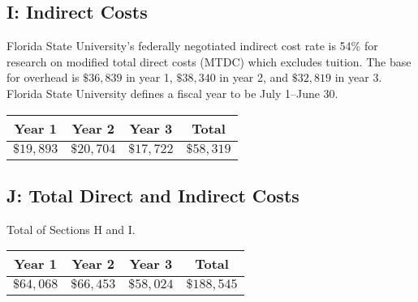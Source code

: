 \documentclass[11pt]{article}
\begin{document}
\subsection*{I: Indirect Costs}
Florida State University's federally negotiated indirect cost rate is
54\% for research on modified total direct costs (MTDC) which excludes
tuition. The base for overhead is $\$36,839$ in year 1, $\$38,340$ in
year 2, and $\$32,819$ in year 3. Florida State University defines a
fiscal year to be July 1--June 30.
\begin{center}
  \begin{tabular}{|c|c|c|c|}
    \hline
    Year 1 & Year 2 & Year 3 & Total \\
    \hline
    $\$19,893$ & $\$20,704$ & $\$17,722$ & $\$58,319$ \\
    \hline
  \end{tabular}
\end{center}


\subsection*{J: Total Direct and Indirect Costs}
Total of Sections H and I.
\begin{center}
  \begin{tabular}{|c|c|c|c|}
    \hline
    Year 1 & Year 2 & Year 3 & Total \\
    \hline
    $\$64,068$ & $\$66,453$ & $\$58,024$ & $\$188,545$ \\
    \hline
  \end{tabular}
\end{center}
\end{document}
